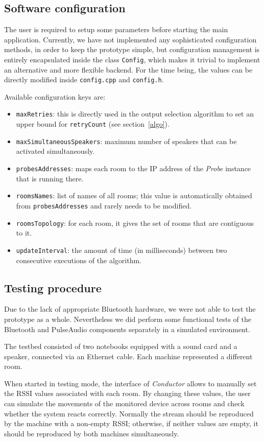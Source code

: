 \documentclass[conference]{IEEEtran}
\newcommand{\Conductor}{\textsl{Conductor}}
\newcommand{\Probe}{\textsl{Probe}}
\begin{document}
\subsection{Software configuration}
The user is required to setup some parameters before starting the main application. Currently, we have not implemented any sophisticated configuration methods, in order to keep the prototype simple, but configuration management is entirely encapsulated inside the class \texttt{Config}, which makes it trivial to implement an alternative and more flexible backend. For the time being, the values can be directly modified inside \texttt{config.cpp} and \texttt{config.h}.

Available configuration keys are:
\begin{itemize}
\item \texttt{maxRetries}: this is directly used in the output selection algorithm to set an upper bound for \texttt{retryCount} (see section~\ref{algo}).
\item \texttt{maxSimultaneousSpeakers}: maximum number of speakers that can be activated simultaneously.
\item \texttt{probesAddresses}: maps each room to the IP address of the \Probe{} instance that is running there.
\item \texttt{roomsNames}: list of names of all rooms; this value is automatically obtained from \texttt{probesAddresses} and rarely needs to be modified.
\item \texttt{roomsTopology}: for each room, it gives the set of rooms that are contiguous to it.
\item \texttt{updateInterval}: the amount of time (in milliseconds) between two consecutive executions of the algorithm.
\end{itemize}

\subsection{Testing procedure}
Due to the lack of appropriate Bluetooth hardware, we were not able to test the prototype as a whole. Nevertheless we did perform some functional tests of the Bluetooth and PulseAudio components separately in a simulated environment.

The testbed consisted of two notebooks equipped with a sound card and a speaker, connected via an Ethernet cable. Each machine represented a different room.

When started in testing mode, the interface of \Conductor{} allows to manually set the RSSI values associated with each room. By changing these values, the user can simulate the movements of the monitored device across rooms and check whether the system reacts correctly. Normally the stream should be reproduced by the machine with a non-empty RSSI; otherwise, if neither values are empty, it should be reproduced by both machines simultaneously.
\end{document}
